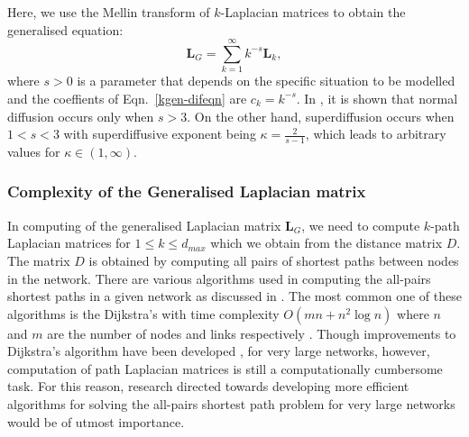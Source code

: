 \documentclass[10pt,a4paper]{article}
\begin{document}
\begin{enumerate}[1)]
\begin{enumerate}[i)]
    	    	Here, we use the Mellin transform of $k$-Laplacian matrices to obtain the generalised equation:
    	    	\begin{equation}
    	    	\mathbf{L}_{G} = \sum_{k=1}^{\infty} k^{-s} \mathbf{L}_k,
    	    	\label{mellin-transforms}
    	    	\end{equation}
    	    	where $s >0$ is a parameter that depends on the specific situation to be modelled and the coeffients of Eqn.~\ref{kgen-difeqn} are $c_{k} = k^{-s}$. 	
    	    	In \citep{estrada2017path}, it is shown that normal diffusion occurs only when $s > 3$. On the other hand, superdiffusion occurs when $1 <s < 3$ with superdiffusive exponent being $ \kappa = \frac{2}{s-1}$,
    	    	which leads to arbitrary values for $\kappa \in (1,\infty)$. 
    	    \end{enumerate}
        \end{enumerate}
        \subsubsection{Complexity of the Generalised Laplacian matrix} 
        In computing of the generalised Laplacian matrix $\mathbf{L}_G$, we need to compute $k$-path Laplacian matrices for $1 \leq k \leq d_{max}$ which we obtain from the distance matrix $D$. The matrix $D$ is obtained by computing all pairs of shortest paths between nodes in the network. There are various algorithms used in computing the all-pairs shortest paths in a given network as discussed in \citep{cherkassky1996shortest} . The most common one of these algorithms is the Dijkstra's with time complexity $O(mn+n^2 \log n)$ where $n$ and $m$ are the number of nodes and links respectively \citep{dijkstra1959note}. Though improvements to Dijkstra's algorithm have been developed \citep{pettie2002faster,thorup1999undirected,seidel1995all}, for very large networks, however, computation of path Laplacian matrices is still a computationally cumbersome task. For this reason, research directed towards developing more efficient algorithms for solving the all-pairs shortest path problem for very large networks would be of utmost importance. 
        
\end{document}
